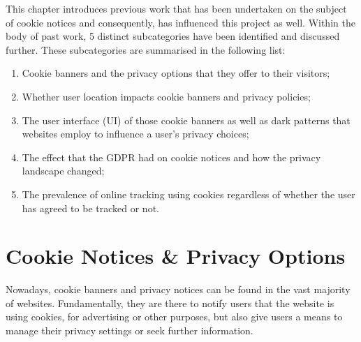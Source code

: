 \documentclass[../main.tex]{subfiles}
\begin{document}
This chapter introduces previous work that has been undertaken on the subject of cookie notices and consequently, has influenced this project as well. Within the body of past work, 5 distinct subcategories have been identified and discussed further. These subcategories are summarised in the following list:

\begin{enumerate}
    \item Cookie banners and the privacy options that they offer to their visitors;
    \item Whether user location impacts cookie banners and privacy policies;
    \item The user interface (UI) of those cookie banners as well as dark patterns that websites employ to influence a user’s privacy choices;
    \item The effect that the GDPR had on cookie notices and how the privacy landscape changed;
    \item The prevalence of online tracking using cookies regardless of whether the user has agreed to be tracked or not. 
\end{enumerate}

\section{Cookie Notices \& Privacy Options}
Nowadays, cookie banners and privacy notices can be found in the vast majority of websites. Fundamentally, they are there to notify users that the website is using cookies, for advertising or other purposes, but also give users a means to manage their privacy settings or seek further information. 
\end{document}
